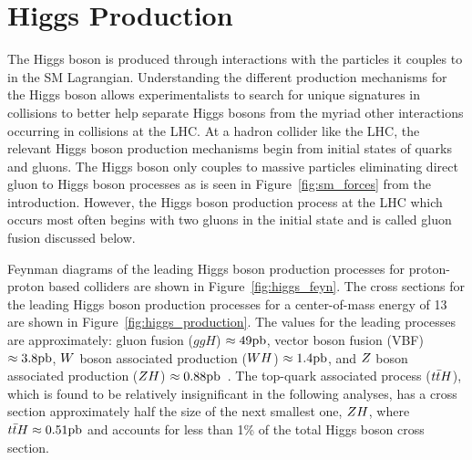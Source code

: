 \section{Higgs Production}
The Higgs boson is produced through interactions with the particles it couples to in the SM
Lagrangian. Understanding the different production mechanisms for the Higgs boson
allows experimentalists to search for unique signatures in collisions to better
help separate Higgs bosons from the myriad other interactions occurring in collisions at the LHC.
At a hadron collider like the LHC, the relevant Higgs boson production
mechanisms begin from initial states of quarks and gluons. The Higgs boson
only couples to massive particles eliminating direct gluon to Higgs boson processes
as is seen in Figure~\ref{fig:sm_forces} from the introduction.
However, the Higgs boson production process at the LHC which occurs most often
begins with two gluons in the initial state and is called gluon fusion discussed below.

Feynman diagrams of the leading Higgs boson production processes for
proton-proton based colliders are shown in Figure~\ref{fig:higgs_feyn}. 
The cross sections for the leading Higgs boson production processes for a 
center-of-mass energy of 13\TeV
are shown in Figure~\ref{fig:higgs_production}. The values for the leading
processes are approximately: gluon fusion ($ggH$) $\approx 49\mathrm{pb}$, 
vector boson fusion (VBF) $\approx 3.8\mathrm{pb}$, $W$ boson associated production ($WH$) $\approx 1.4\mathrm{pb}$,
and $Z$ boson associated production ($ZH$) $\approx 0.88\mathrm{pb}$~\cite{deFlorian:2016spz}. 
The top-quark associated process ($t\bar{t}H$),
which is found to be relatively insignificant in the following analyses, has a cross
section approximately half the size of the next smallest one, $ZH$, where
$t\bar{t}H \approx 0.51\mathrm{pb}$ and accounts for less than 1\% of the total Higgs boson
cross section.


